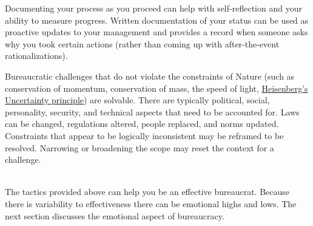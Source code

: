 Documenting your process as you proceed can help with self-reflection and your ability to measure progress. Written documentation of your status can be used as proactive updates to your management and provides a record when someone asks  why you took certain actions (rather than coming up with after-the-event rationalizations).

Bureaucratic challenges that do not violate the constraints of Nature (such as conservation of momentum, conservation of mass, the speed of light, \href{https://en.wikipedia.org/wiki/Uncertainty_principle}{Heisenberg's Uncertainty principle}) 
are solvable. There are typically political, social, personality, security, and technical aspects that need to be accounted for. Laws can be changed, regulations altered, people replaced, and norms updated. Constraints that appear to be logically inconsistent may be reframed to be resolved. Narrowing or broadening the scope may reset the context for a challenge.

\ \\


The tactics provided above can help you be an effective bureaucrat. Because there is variability to effectiveness there can be emotional highs and lows. The next section discusses the emotional aspect of bureaucracy.

